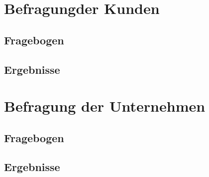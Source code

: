 \appendix
\section{Befragungder Kunden}
\label{sec:kundenbefragung}
\subsection{Fragebogen}
\subsection{Ergebnisse}

\section{Befragung der Unternehmen}
\label{sec:betriebsbefragung}
\subsection{Fragebogen}
\subsection{Ergebnisse}
